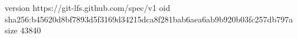 version https://git-lfs.github.com/spec/v1
oid sha256:b45620d8bf7893d5f3169d34215dca8f281bab6aea6ab9b920b03fc257db797a
size 43840
